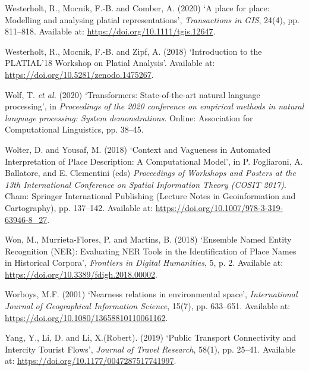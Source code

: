 \documentclass[
  letterpaper,
  11pt,
  english,
  onehalfspacing,
  headsepline]{MastersDoctoralThesis}
\newlength{\cslhangindent}
\newlength{\cslentryspacingunit} %
\newenvironment{CSLReferences}[2] %
 {%
  \setlength{\parindent}{0pt}
  \ifodd #1
  \let\oldpar\par
  \def\par{\hangindent=\cslhangindent\oldpar}
  \fi
  \setlength{\parskip}{#2\cslentryspacingunit}
 }%
 {}
\begin{document}
\begin{CSLReferences}{0}{0}
\leavevmode{}%
Westerholt, R., Mocnik, F.-B. and Comber, A. (2020) {`A place for place:
{Modelling} and analysing platial representations'}, \emph{Transactions
in GIS}, 24(4), pp. 811--818. Available at:
\url{https://doi.org/10.1111/tgis.12647}.

\leavevmode{}%
Westerholt, R., Mocnik, F.-B. and Zipf, A. (2018) {`Introduction to the
{PLATIAL}'18 {Workshop} on {Platial Analysis}'}. Available at:
\url{https://doi.org/10.5281/zenodo.1475267}.

\leavevmode{}%
Wolf, T. \emph{et al.} (2020) {`Transformers: {State-of-the-art} natural
language processing'}, in \emph{Proceedings of the 2020 conference on
empirical methods in natural language processing: {System}
demonstrations}. {Online}: {Association for Computational Linguistics},
pp. 38--45.

\leavevmode{}%
Wolter, D. and Yousaf, M. (2018) {`Context and {Vagueness} in {Automated
Interpretation} of {Place Description}: {A Computational Model}'}, in P.
Fogliaroni, A. Ballatore, and E. Clementini (eds) \emph{Proceedings of
{Workshops} and {Posters} at the 13th {International Conference} on
{Spatial Information Theory} ({COSIT} 2017)}. {Cham}: {Springer
International Publishing} (Lecture {Notes} in {Geoinformation} and
{Cartography}), pp. 137--142. Available at:
\url{https://doi.org/10.1007/978-3-319-63946-8_27}.

\leavevmode{}%
Won, M., Murrieta-Flores, P. and Martins, B. (2018) {`Ensemble {Named
Entity Recognition} ({NER}): {Evaluating NER Tools} in the
{Identification} of {Place Names} in {Historical Corpora}'},
\emph{Frontiers in Digital Humanities}, 5, p. 2. Available at:
\url{https://doi.org/10.3389/fdigh.2018.00002}.

\leavevmode{}%
Worboys, M.F. (2001) {`Nearness relations in environmental space'},
\emph{International Journal of Geographical Information Science}, 15(7),
pp. 633--651. Available at:
\url{https://doi.org/10.1080/13658810110061162}.

\leavevmode{}%
Yang, Y., Li, D. and Li, X.(Robert). (2019) {`Public {Transport
Connectivity} and {Intercity Tourist Flows}'}, \emph{Journal of Travel
Research}, 58(1), pp. 25--41. Available at:
\url{https://doi.org/10.1177/0047287517741997}.


\end{CSLReferences}
\end{document}

